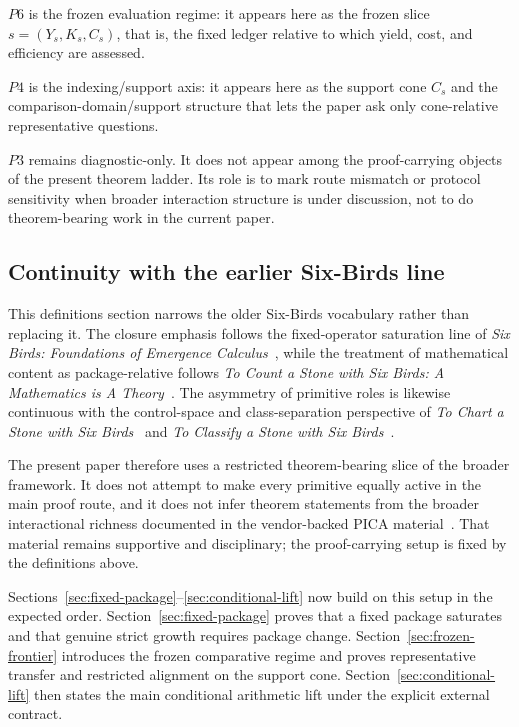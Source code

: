 \documentclass[11pt]{article}
\begin{document}
\(P6\) is the frozen evaluation regime: it appears here as the frozen slice $s=(Y_s,K_s,C_s)$, that is, the fixed ledger relative to which yield, cost, and efficiency are assessed.

\(P4\) is the indexing/support axis: it appears here as the support cone $C_s$ and the comparison-domain/support structure that lets the paper ask only cone-relative representative questions.

\(P3\) remains diagnostic-only. It does not appear among the proof-carrying objects of the present theorem ladder. Its role is to mark route mismatch or protocol sensitivity when broader interaction structure is under discussion, not to do theorem-bearing work in the current paper.

\subsection*{Continuity with the earlier Six-Birds line}

This definitions section narrows the older Six-Birds vocabulary rather than replacing it. The closure emphasis follows the fixed-operator saturation line of \emph{Six Birds: Foundations of Emergence Calculus}~\cite{Tsiokos2026Foundations}, while the treatment of mathematical content as package-relative follows \emph{To Count a Stone with Six Birds: A Mathematics is A Theory}~\cite{Tsiokos2026ToCount}. The asymmetry of primitive roles is likewise continuous with the control-space and class-separation perspective of \emph{To Chart a Stone with Six Birds}~\cite{Tsiokos2026ToChart} and \emph{To Classify a Stone with Six Birds}~\cite{Tsiokos2026ToClassify}.

The present paper therefore uses a restricted theorem-bearing slice of the broader framework. It does not attempt to make every primitive equally active in the main proof route, and it does not infer theorem statements from the broader interactional richness documented in the vendor-backed PICA material~\cite{Tsiokos2026ToCreate}. That material remains supportive and disciplinary; the proof-carrying setup is fixed by the definitions above.

\medskip\noindent
Sections~\ref{sec:fixed-package}--\ref{sec:conditional-lift} now build on this setup in the expected order. Section~\ref{sec:fixed-package} proves that a fixed package saturates and that genuine strict growth requires package change. Section~\ref{sec:frozen-frontier} introduces the frozen comparative regime and proves representative transfer and restricted alignment on the support cone. Section~\ref{sec:conditional-lift} then states the main conditional arithmetic lift under the explicit external contract.
\end{document}
